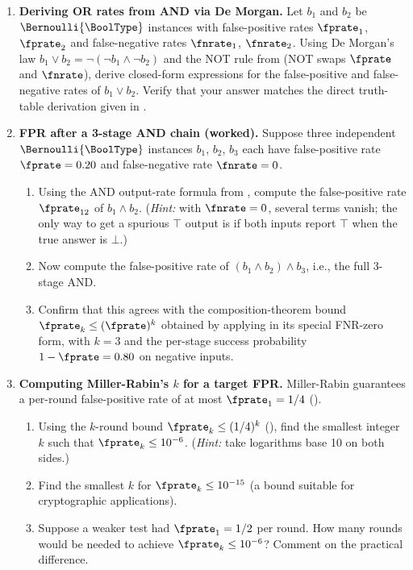 \begin{enumerate}


\item \exstar
\textbf{Deriving OR rates from AND via De Morgan.}
Let $b_1$ and $b_2$ be $\Bernoulli{\BoolType}$ instances with false-positive
rates $\fprate_1$, $\fprate_2$ and false-negative rates $\fnrate_1$, $\fnrate_2$.
Using De Morgan's law $b_1 \vee b_2 = \neg(\neg b_1 \wedge \neg b_2)$
and the NOT rule from  (NOT swaps $\fprate$ and $\fnrate$),
derive closed-form expressions for the false-positive and false-negative
rates of $b_1 \vee b_2$.
Verify that your answer matches the direct truth-table derivation given
in .

\item \exstar
\textbf{FPR after a 3-stage AND chain (worked).}
Suppose three independent $\Bernoulli{\BoolType}$ instances $b_1$, $b_2$, $b_3$
each have false-positive rate $\fprate = 0.20$ and false-negative rate
$\fnrate = 0$.
\begin{enumerate}
  \item[(a)] Using the AND output-rate formula from ,
    compute the false-positive rate $\fprate_{12}$ of $b_1 \wedge b_2$.
    (\textit{Hint:} with $\fnrate = 0$, several terms vanish; the
    only way to get a spurious $\top$ output is if both inputs report
    $\top$ when the true answer is $\bot$.)
  \item[(b)] Now compute the false-positive rate of
    $(b_1 \wedge b_2) \wedge b_3$, i.e., the full 3-stage AND.
  \item[(c)] Confirm that this agrees with the composition-theorem bound
    $\fprate_k \leq (\fprate)^k$ obtained by applying 
    in its special FNR-zero form, with $k = 3$ and the per-stage success
    probability $1 - \fprate = 0.80$ on negative inputs.
\end{enumerate}

\item \exstar
\textbf{Computing Miller-Rabin's $k$ for a target FPR.}
Miller-Rabin guarantees a per-round false-positive rate of at most
$\fprate_1 = 1/4$ ().
\begin{enumerate}
  \item[(a)] Using the $k$-round bound $\fprate_k \leq (1/4)^k$
    (), find the smallest integer $k$ such that
    $\fprate_k \leq 10^{-6}$.
    (\textit{Hint:} take logarithms base 10 on both sides.)
  \item[(b)] Find the smallest $k$ for $\fprate_k \leq 10^{-15}$
    (a bound suitable for cryptographic applications).
  \item[(c)] Suppose a weaker test had $\fprate_1 = 1/2$ per round.
    How many rounds would be needed to achieve $\fprate_k \leq 10^{-6}$?
    Comment on the practical difference.
\end{enumerate}


\end{enumerate}
